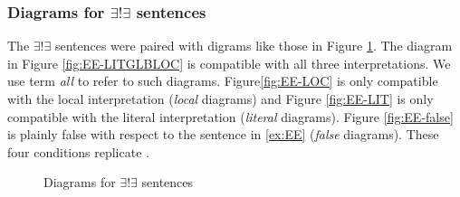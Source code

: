 \documentclass[a4paper,10pt]{article}
\begin{document}
\subsubsection{Diagrams for $\exists! \exists$ sentences}

The $\exists! \exists$ sentences were paired with digrams like those in Figure \ref{fig:EE}. The diagram in Figure \ref{fig:EE-LITGLBLOC} is compatible with all three interpretations.  We use  term {\it all} to refer to such diagrams. Figure\ref{fig:EE-LOC} is only compatible with the local interpretation ({\it local} diagrams) and Figure \ref{fig:EE-LIT} is only compatible with the literal interpretation ({\it literal} diagrams). Figure \ref{fig:EE-false} is plainly false with respect to the sentence in \ref{ex:EE} ({\it false} diagrams). These four conditions replicate  .

\begin{figure}[ht]
\centering
{}
\caption[Optional caption for list of figures]{Diagrams for $\exists! \exists$ sentences}
\label{fig:EE}
\end{figure}
\end{document}
